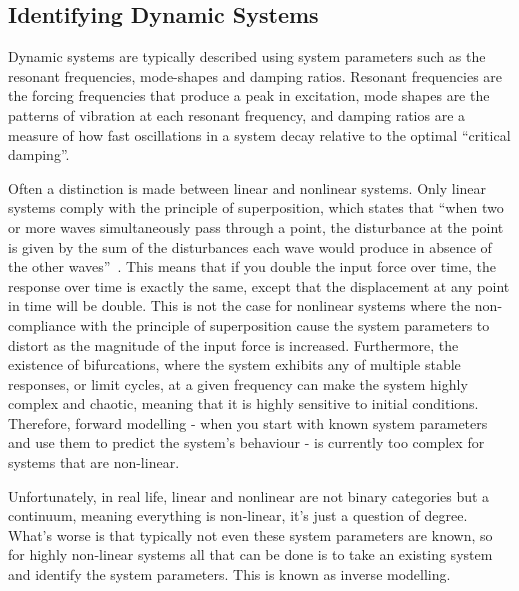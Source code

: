 \documentclass[12pt]{article}
\begin{document}
    \subsection{Identifying Dynamic Systems}

    Dynamic systems are typically described using system parameters such as the resonant frequencies, mode-shapes and damping ratios.
    Resonant frequencies are the forcing frequencies that produce a peak in excitation, mode shapes are the patterns of vibration at each resonant frequency, and damping ratios are a measure of how fast oscillations in a system decay relative to the optimal ``critical damping''.

    Often a distinction is made between linear and nonlinear systems.
    Only linear systems comply with the principle of superposition, which states that ``when two or more waves simultaneously pass through a point, the disturbance at the point is given by the sum of the disturbances each wave would produce in absence of the other waves''~\cite{StudyComSuperposition}.
    This means that if you double the input force over time, the response over time is exactly the same, except that the displacement at any point in time will be double.
    This is not the case for nonlinear systems where the non-compliance with the principle of superposition cause the system parameters to distort as the magnitude of the input force is increased.
    Furthermore, the existence of bifurcations, where the system exhibits any of multiple stable responses, or limit cycles, at a given frequency can make the system highly complex and chaotic, meaning that it is highly sensitive to initial conditions.
    Therefore, forward modelling - when you start with known system parameters and use them to predict the system's behaviour - is currently too complex for systems that are non-linear.

    Unfortunately, in real life, linear and nonlinear are not binary categories but a continuum, meaning everything is non-linear, it's just a question of degree.
    What's worse is that typically not even these system parameters are known, so for highly non-linear systems all that can be done is to take an existing system and identify the system parameters.
    This is known as inverse modelling.
\end{document}
